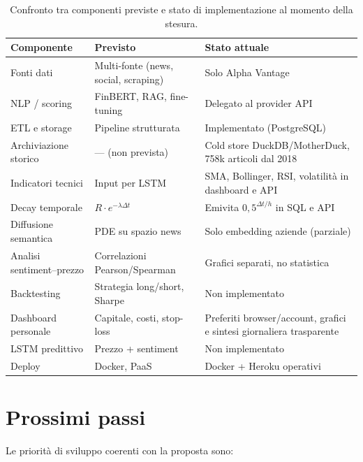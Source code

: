 \begin{table}[H]
\centering
\renewcommand{\arraystretch}{1.3}
\begin{tabular}{|p{5.5cm}|p{4cm}|p{4.5cm}|}
\hline
\textbf{Componente} & \textbf{Previsto} & \textbf{Stato attuale} \\
\hline
Fonti dati & Multi-fonte (news, social, scraping) & Solo Alpha Vantage \\
\hline
NLP / scoring & FinBERT, RAG, fine-tuning & Delegato al provider API \\
\hline
ETL e storage & Pipeline strutturata & Implementato (PostgreSQL) \\
\hline
Archiviazione storico & --- (non prevista) & Cold store DuckDB/MotherDuck, 758k articoli dal 2018 \\
\hline
Indicatori tecnici & Input per LSTM & SMA, Bollinger, RSI, volatilità in dashboard e API \\
\hline
Decay temporale & $R \cdot e^{-\lambda \Delta t}$ & Emivita $0{,}5^{\Delta t/h}$ in SQL e API \\
\hline
Diffusione semantica & PDE su spazio news & Solo embedding aziende (parziale) \\
\hline
Analisi sentiment--prezzo & Correlazioni Pearson/Spearman & Grafici separati, no statistica \\
\hline
Backtesting & Strategia long/short, Sharpe & Non implementato \\
\hline
Dashboard personale & Capitale, costi, stop-loss & Preferiti browser/account, grafici e sintesi giornaliera trasparente \\
\hline
LSTM predittivo & Prezzo + sentiment & Non implementato \\
\hline
Deploy & Docker, PaaS & Docker + Heroku operativi \\
\hline
\end{tabular}
\caption{Confronto tra componenti previste e stato di implementazione al momento della stesura.}
\label{tab:previsto-implementato}
\end{table}

\section{Prossimi passi}

Le priorità di sviluppo coerenti con la proposta sono:

